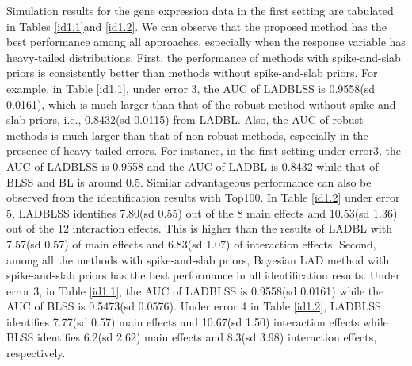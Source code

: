 \documentclass[12pt]{article}
\begin{document}
Simulation results for the gene expression data in the first setting are tabulated in Tables \ref{id1.1}and \ref{id1.2}. We can observe that the proposed method has the best performance among all approaches, especially when the response variable has heavy-tailed distributions. First, the performance of methods with spike-and-slab priors is consistently better than methods without spike-and-slab priors. For example, in Table \ref{id1.1}, under error 3, the AUC of LADBLSS is 0.9558(sd 0.0161), which is much larger than that of the robust method without spike-and-slab priors, i.e., 0.8432(sd 0.0115) from LADBL. Also, the AUC of robust methods is much larger than that of non-robust methods, especially in the presence of heavy-tailed errors. For instance, in the first setting under error3, the AUC of LADBLSS is 0.9558 and the AUC of LADBL is 0.8432 while that of BLSS and BL is around 0.5. Similar advantageous performance can also be observed from the identification results with Top100.  In Table \ref{id1.2} under error 5, LADBLSS identifies 7.80(sd 0.55) out of the 8 main effects and 10.53(sd 1.36) out of the 12 interaction effects. This is higher than the results of LADBL with 7.57(sd 0.57) of main effects and 6.83(sd 1.07) of interaction effects. Second, among all the methods with spike-and-slab priors,  Bayesian LAD method with spike-and-slab priors has the best performance in all identification results. Under error 3, in Table \ref{id1.1}, the AUC of LADBLSS is 0.9558(sd 0.0161) while the AUC of BLSS is 0.5473(sd 0.0576). Under error 4 in Table \ref{id1.2}, LADBLSS identifies 7.77(sd 0.57) main effects and 10.67(sd 1.50) interaction effects while BLSS identifies 6.2(sd 2.62) main effects and 8.3(sd 3.98) interaction effects, respectively.
\end{document}
